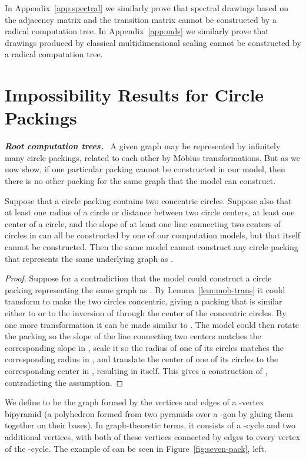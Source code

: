 \documentclass[oribibl,10pt]{llncs}
\newcommand{\Emph}[1]{\smallskip\textbf{\textit{#1}}~}
\begin{document}
In Appendix~\ref{app:spectral} we similarly prove that spectral drawings based on the adjacency matrix and the transition matrix cannot be constructed by a radical computation tree.  In Appendix~\ref{app:mds} we similarly prove that drawings produced by classical multidimensional scaling cannot be constructed by a radical computation tree.
\section{Impossibility Results for Circle Packings}

\Emph{Root computation trees.} A given graph may be represented by infinitely many circle packings, related to each other by M\"obius transformations. But as we now show, if one particular packing cannot be constructed in our model, then there is no other packing for the same graph that the model can construct.

\begin{lemma}
\label{lem:concentric}
Suppose that a circle packing  contains two concentric circles. Suppose also that at least one radius of a circle or distance between two circle centers, at least one center of a circle, and the slope of at least one line connecting two centers of circles in  can all be constructed by one of our computation models, but that  itself cannot be constructed. Then the same model cannot construct any circle packing that represents the same underlying graph as .
\end{lemma}

\begin{proof}
Suppose for a contradiction that the model could construct a circle packing  representing the same graph as . By Lemma~\ref{lem:mob-trans} it could transform  to make the two circles concentric, giving a packing that is similar either to  or to the inversion of  through the center of the concentric circles. By one more transformation it can be made similar to . The model could then rotate the packing so the slope of the line connecting two centers matches the corresponding slope in , scale it so the radius of one of its circles matches the corresponding radius in , and translate  the center of one of its circles to the corresponding center in , resulting in  itself. This gives a construction of , contradicting the assumption.
\end{proof}

We define  to be the graph formed by the vertices and edges of a -vertex bipyramid (a polyhedron formed from two pyramids over a -gon by gluing them together on their bases). In graph-theoretic terms, it consists of a -cycle and two additional vertices, with both of these vertices connected by edges to every vertex of the -cycle.  The example of  can be seen in Figure~\ref{fig:seven-pack}, left.
\end{document}
